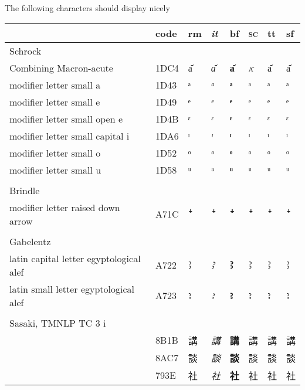 The following characters should display nicely

\begin{tabularx}{\textwidth}{Xl l >{\itshape}l>{\bfseries}l>{\scshape}l>{\ttfamily}l>{\sffamily}l}
\lsptoprule
 & code & rm & it & bf & sc & tt & sf \\
\midrule
Schrock\\
\midrule
 Combining Macron-acute & 1DC4 & a᷄ & a᷄ & a᷄ & a᷄ & a᷄ &  a᷄  \\
modifier letter small a & 1D43 & ᵃ & ᵃ & ᵃ & ᵃ & ᵃ & ᵃ \\
modifier letter small e & 1D49 & ᵉ & ᵉ & ᵉ & ᵉ & ᵉ & ᵉ \\
modifier letter small open e& 1D4B & ᵋ & ᵋ & ᵋ & ᵋ & ᵋ & ᵋ \\
modifier letter small capital i& 1DA6 & ᶦ & ᶦ & ᶦ & ᶦ & ᶦ & ᶦ \\
modifier letter small o & 1D52 & ᵒ & ᵒ & ᵒ & ᵒ & ᵒ & ᵒ \\
modifier letter small u & 1D58 & ᵘ & ᵘ & ᵘ & ᵘ & ᵘ & ᵘ \\
\\
Brindle\\
\midrule
modifier letter raised down arrow  & A71C & ꜜ & ꜜ & ꜜ & ꜜ & ꜜ & ꜜ \\
\\
Gabelentz\\
\midrule
latin capital letter egyptological alef & A722 & Ꜣ & Ꜣ & Ꜣ & Ꜣ & Ꜣ & Ꜣ \\
latin small letter egyptological alef & A723 & ꜣ & ꜣ & ꜣ & ꜣ & ꜣ & ꜣ \\
\\
Sasaki, TMNLP TC 3 i\\
\midrule
 & 8B1B & 講 & 講 & 講 & 講 & 講 & 講 \\
 & 8AC7 & 談 & 談 & 談 & 談 & 談 & 談 \\
 & 793E & 社 & 社 & 社 & 社 & 社 & 社 \\
\end{tabularx}


